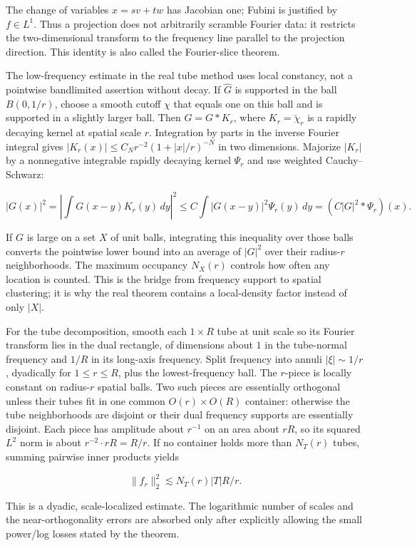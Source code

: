 The change of variables \(x=sv+tw\) has Jacobian one; Fubini is justified by \(f\in L^1\). Thus a projection does not arbitrarily scramble Fourier data: it restricts the two-dimensional transform to the frequency line parallel to the projection direction. This identity is also called the Fourier-slice theorem.

The low-frequency estimate in the real tube method uses local constancy, not a pointwise bandlimited assertion without decay. If \(\widehat G\) is supported in the ball \(B(0,1/r)\), choose a smooth cutoff \(\chi\) that equals one on this ball and is supported in a slightly larger ball. Then \(G=G*K_r\), where \(K_r=\check\chi_r\) is a rapidly decaying kernel at spatial scale \(r\). Integration by parts in the inverse Fourier integral gives \(|K_r(x)|\le C_Nr^{-2}(1+|x|/r)^{-N}\) in two dimensions. Majorize \(|K_r|\) by a nonnegative integrable rapidly decaying kernel \(\Psi_r\) and use weighted Cauchy--Schwarz:

\[|G(x)|^2=\left|\int G(x-y)K_r(y)\,dy\right|^2\le C\int |G(x-y)|^2\Psi_r(y)\,dy=(C|G|^2*\Psi_r)(x).\]

If \(G\) is large on a set \(X\) of unit balls, integrating this inequality over those balls converts the pointwise lower bound into an average of \(|G|^2\) over their radius-\(r\) neighborhoods. The maximum occupancy \(N_X(r)\) controls how often any location is counted. This is the bridge from frequency support to spatial clustering; it is why the real theorem contains a local-density factor instead of only \(|X|\).

For the tube decomposition, smooth each \(1\times R\) tube at unit scale so its Fourier transform lies in the dual rectangle, of dimensions about \(1\) in the tube-normal frequency and \(1/R\) in its long-axis frequency. Split frequency into annuli \(|\xi|\sim1/r\), dyadically for \(1\le r\le R\), plus the lowest-frequency ball. The \(r\)-piece is locally constant on radius-\(r\) spatial balls. Two such pieces are essentially orthogonal unless their tubes fit in one common \(O(r)\times O(R)\) container: otherwise the tube neighborhoods are disjoint or their dual frequency supports are essentially disjoint. Each piece has amplitude about \(r^{-1}\) on an area about \(rR\), so its squared \(L^2\) norm is about \(r^{-2}\cdot rR=R/r\). If no container holds more than \(N_T(r)\) tubes, summing pairwise inner products yields

\[\|f_r\|_2^2\lesssim N_T(r)|T|R/r.\]

This is a dyadic, scale-localized estimate. The logarithmic number of scales and the near-orthogonality errors are absorbed only after explicitly allowing the small power/log losses stated by the theorem.

